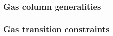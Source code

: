 \subsubsection{Gas column generalities}         \label{hub: generalities: gas and refunds: generalities}                    
\subsubsection{Gas transition constraints}      \label{hub: generalities: gas and refunds: gas transition constraints}      
